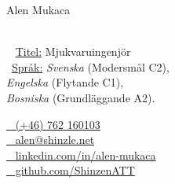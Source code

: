 \begin{minipage}[t]{0.4\textwidth}
    \vspace{0pt} %
    {\par\centering\huge{Alen Mukaca}} \\[0.3cm]

    {\small
    \faGraduationCap~ \underline{Titel:} Mjukvaruingenjör \\
    \faCommentsO~\underline{Språk:} \emph{Svenska} (Modersmål C2), \\ \emph{Engelska} (Flytande C1), \\ \emph{Bosniska} (Grundläggande A2).}
\end{minipage}\hfill
\begin{minipage}[t]{0.55\textwidth}
    \vspace{0pt} %
    \href{tel:+46762160103}{\faPhone~ (+46) 762 160103} \\
    \href{mailto:alen@shinzle.net}{\faEnvelopeO~ \protect alen@shinzle.net} \\[0.1cm]

    \href{https://linkedin.com/in/alen-mukaca/}{\faLinkedin~ \protect linkedin.com/in/alen-mukaca} \\
    \href{https://github.com/ShinzenATT}{\faGithub~ \protect github.com/ShinzenATT} \\
\end{minipage}
